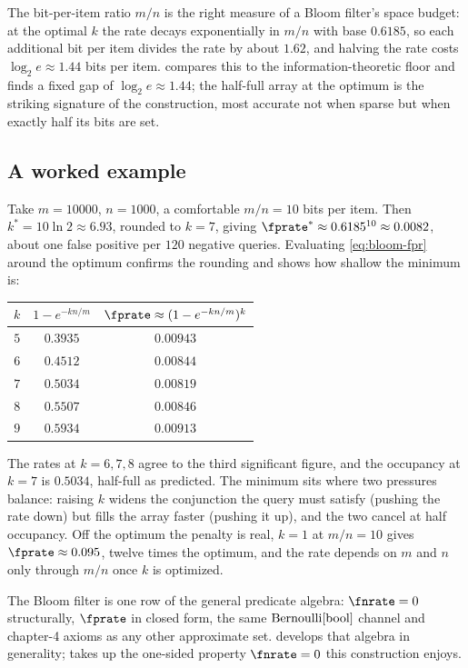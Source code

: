 The bit-per-item ratio $m/n$ is the right measure of a Bloom filter's space
budget: at the optimal $k$ the rate decays exponentially in $m/n$ with base
$0.6185$, so each additional bit per item divides the rate by about $1.62$,
and halving the rate costs $\log_2 e \approx 1.44$ bits per item.
 compares this to the information-theoretic
floor and finds a fixed gap of $\log_2 e \approx 1.44$; the half-full array
at the optimum is the striking signature of the construction, most accurate
not when sparse but when exactly half its bits are set.

\subsection*{A worked example}

Take $m = 10000$, $n = 1000$, a comfortable $m/n = 10$ bits per item. Then
$k^* = 10\ln 2 \approx 6.93$, rounded to $k = 7$, giving
$\fprate^* \approx 0.6185^{10} \approx 0.0082$, about one false positive
per $120$ negative queries. Evaluating \eqref{eq:bloom-fpr} around the
optimum confirms the rounding and shows how shallow the minimum is:
\begin{center}
\begin{tabular}{ccc}
\hline
$k$ & $1 - e^{-kn/m}$ & $\fprate \approx (1 - e^{-kn/m})^k$ \\
\hline
$5$ & $0.3935$ & $0.00943$ \\
$6$ & $0.4512$ & $0.00844$ \\
$7$ & $0.5034$ & $0.00819$ \\
$8$ & $0.5507$ & $0.00846$ \\
$9$ & $0.5934$ & $0.00913$ \\
\hline
\end{tabular}
\end{center}
The rates at $k = 6, 7, 8$ agree to the third significant figure, and the
occupancy at $k = 7$ is $0.5034$, half-full as predicted. The minimum sits
where two pressures balance: raising $k$ widens the conjunction the query
must satisfy (pushing the rate down) but fills the array faster (pushing it
up), and the two cancel at half occupancy. Off the optimum the penalty is
real, $k = 1$ at $m/n = 10$ gives $\fprate \approx 0.095$, twelve times the
optimum, and the rate depends on $m$ and $n$ only through $m/n$ once $k$ is
optimized.

The Bloom filter is one row of the general predicate algebra:
$\fnrate = 0$ structurally, $\fprate$ in closed form, the same
$\mathrm{Bernoulli}[\mathrm{bool}]$ channel and chapter-4 axioms as any other
approximate set.  develops that algebra in
generality;  takes up the one-sided property
$\fnrate = 0$ this construction enjoys.
